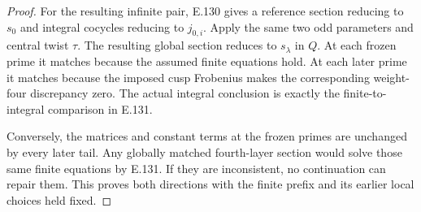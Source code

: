 \begin{proof}
For the resulting infinite pair, E.130 gives a
reference section reducing to \(s_0\) and integral
cocycles reducing to \(j_{0,i}\).
Apply the same two odd parameters and central
twist \(\tau\). The resulting global section
reduces to \(s_\lambda\) in \(Q\).
At each frozen prime it matches because the
assumed finite equations hold. At each later
prime it matches because the imposed cusp
Frobenius makes the corresponding weight-four
discrepancy zero. The actual integral conclusion
is exactly the finite-to-integral comparison
in E.131.

Conversely, the matrices and constant terms at
the frozen primes are unchanged by every later
tail. Any globally matched fourth-layer section
would solve those same finite equations by E.131.
If they are inconsistent, no continuation can
repair them. This proves both directions with
the finite prefix and its earlier local choices
held fixed.
\end{proof}
